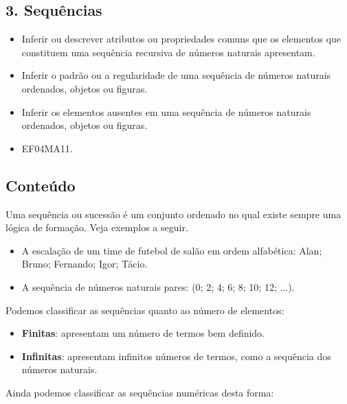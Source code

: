 \begin{enumerate}
\begin{escolha}
\section{3. Sequências}\label{muxf3dulo-3}


\begin{itemize}
\item Inferir ou descrever atributos ou propriedades comuns que os elementos
que constituem uma sequência recursiva de números naturais apresentam.
\item Inferir o padrão ou a regularidade de uma sequência de números
naturais ordenados, objetos ou figuras.
\item Inferir os elementos ausentes em uma sequência de números naturais
ordenados, objetos ou figuras.
\end{itemize}


\begin{itemize}
\item EF04MA11.
\end{itemize}

\subsection{Conteúdo}\label{conteuxfado-2}

Uma sequência ou sucessão é um conjunto ordenado no qual
existe sempre uma lógica de formação. Veja exemplos a seguir.

\begin{itemize}
\item
  A escalação de um time de futebol de salão em ordem alfabética: Alan; Bruno; Fernando; Igor; Tácio.
\item
  A sequência de números naturais pares: (0; 2; 4; 6; 8; 10; 12; ...).
\end{itemize}

Podemos classificar as sequências quanto ao número de elementos:

\begin{itemize}
\item
  \textbf{Finitas}: apresentam um número de termos bem definido.
\item
  \textbf{Infinitas}: apresentam infinitos números de termos, como
  a sequência dos números naturais.
\end{itemize}

Ainda podemos classificar as sequências numéricas desta forma:


\end{escolha}
\end{enumerate}
